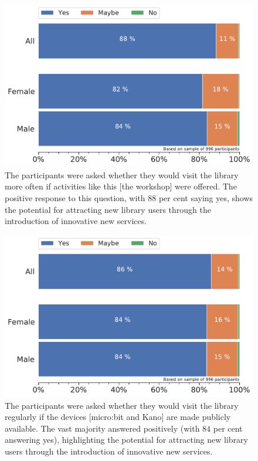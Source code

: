 \documentclass[12pt]{report} %
\begin{document}
\begin{figure}[t!]
    \centering
        \includegraphics[width=1\textwidth]{bar_VisitLibrary_Activities}
\caption{The participants were asked whether they would visit the library more often if activities like this [the workshop] were offered. The positive response to this question, with 88 per cent saying yes, shows the potential for attracting new library users through the introduction of innovative new services.  } 
\label{fig:libraryvisitactivities}
\end{figure}

\begin{figure}[t!]
    \centering
        \includegraphics[width=1\textwidth]{bar_VisitLibrary_Devices}
\caption{The participants were asked whether they would visit the library regularly if the devices [micro:bit and Kano] are made publicly available. The vast majority answered positively (with $84$ per cent answering yes), highlighting the potential for attracting new library users through the introduction of innovative new services.} 
\label{fig:libraryvisitdevices}
\end{figure}
\end{document}
